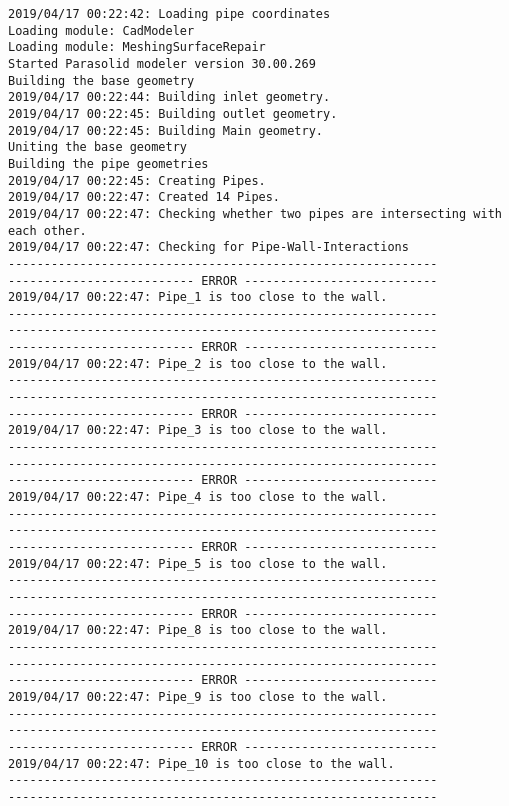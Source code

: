 \documentclass{article}
\begin{document}
{\tiny 
\begin{verbatim}
2019/04/17 00:22:42: Loading pipe coordinates
Loading module: CadModeler
Loading module: MeshingSurfaceRepair
Started Parasolid modeler version 30.00.269
Building the base geometry
2019/04/17 00:22:44: Building inlet geometry.
2019/04/17 00:22:45: Building outlet geometry.
2019/04/17 00:22:45: Building Main geometry.
Uniting the base geometry
Building the pipe geometries
2019/04/17 00:22:45: Creating Pipes.
2019/04/17 00:22:47: Created 14 Pipes.
2019/04/17 00:22:47: Checking whether two pipes are intersecting with each other.
2019/04/17 00:22:47: Checking for Pipe-Wall-Interactions
------------------------------------------------------------
-------------------------- ERROR ---------------------------
2019/04/17 00:22:47: Pipe_1 is too close to the wall.
------------------------------------------------------------
------------------------------------------------------------
-------------------------- ERROR ---------------------------
2019/04/17 00:22:47: Pipe_2 is too close to the wall.
------------------------------------------------------------
------------------------------------------------------------
-------------------------- ERROR ---------------------------
2019/04/17 00:22:47: Pipe_3 is too close to the wall.
------------------------------------------------------------
------------------------------------------------------------
-------------------------- ERROR ---------------------------
2019/04/17 00:22:47: Pipe_4 is too close to the wall.
------------------------------------------------------------
------------------------------------------------------------
-------------------------- ERROR ---------------------------
2019/04/17 00:22:47: Pipe_5 is too close to the wall.
------------------------------------------------------------
------------------------------------------------------------
-------------------------- ERROR ---------------------------
2019/04/17 00:22:47: Pipe_8 is too close to the wall.
------------------------------------------------------------
------------------------------------------------------------
-------------------------- ERROR ---------------------------
2019/04/17 00:22:47: Pipe_9 is too close to the wall.
------------------------------------------------------------
------------------------------------------------------------
-------------------------- ERROR ---------------------------
2019/04/17 00:22:47: Pipe_10 is too close to the wall.
------------------------------------------------------------
------------------------------------------------------------

\end{verbatim}}
\end{document}
